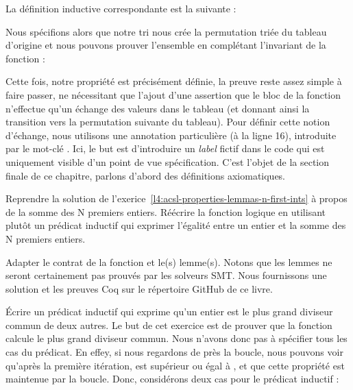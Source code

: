 La définition inductive correspondante est la suivante :






Nous spécifions alors que notre tri nous crée la permutation triée du tableau
d'origine et nous pouvons prouver l'ensemble en complétant l'invariant de la
fonction :





Cette fois, notre propriété est précisément définie, la preuve reste assez
simple à faire passer, ne nécessitant que l'ajout d'une assertion que le bloc
de la fonction n'effectue qu'un échange des valeurs dans le tableau (et donnant
ainsi la transition vers la permutation suivante du tableau). Pour définir cette
notion d'échange, nous utilisons une annotation particulière (à la ligne 16),
introduite par le mot-clé . Ici, le but est d'introduire un \textit{label}
fictif dans le code qui est uniquement visible d'un point de vue spécification.
C'est l'objet de la section finale de ce chapitre, parlons d'abord des définitions
axiomatiques.








Reprendre la solution de l'exerice~\ref{l4:acsl-properties-lemmas-n-first-ints} à
propos de la somme des N premiers entiers. Réécrire la fonction logique en utilisant
plutôt un prédicat inductif qui exprimer l'égalité entre un entier et la somme des
N premiers entiers.





Adapter le contrat de la fonction et le(s) lemme(s). Notons que les lemmes ne
seront certainement pas prouvés par les solveurs SMT. Nous fournissons une solution
et les preuves Coq sur le répertoire GitHub de ce livre.





Écrire un prédicat inductif qui exprime qu'un entier est le plus grand diviseur
commun de deux autres. Le but de cet exercice est de prouver que la fonction
 calcule le plus grand diviseur commun. Nous n'avons donc pas
à spécifier tous les cas du prédicat. En effey, si nous regardons de près la boucle,
nous pouvons voir qu'après la première itération,  est supérieur ou
égal à , et que cette propriété est maintenue par la boucle. Donc,
considérons deux cas pour le prédicat inductif :

